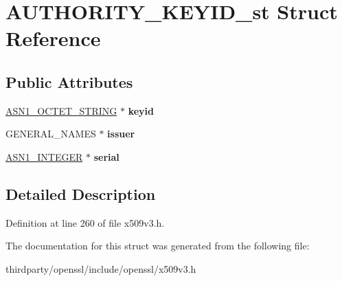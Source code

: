 \hypertarget{struct_a_u_t_h_o_r_i_t_y___k_e_y_i_d__st}{}\section{A\+U\+T\+H\+O\+R\+I\+T\+Y\+\_\+\+K\+E\+Y\+I\+D\+\_\+st Struct Reference}
\label{struct_a_u_t_h_o_r_i_t_y___k_e_y_i_d__st}
\subsection*{Public Attributes}
\begin{DoxyCompactItemize}
\item 
\mbox{\label{struct_a_u_t_h_o_r_i_t_y___k_e_y_i_d__st_ad9aea22a1fc62bcf0669f7feba4e38a7}} 
\hyperlink{structasn1__string__st}{A\+S\+N1\+\_\+\+O\+C\+T\+E\+T\+\_\+\+S\+T\+R\+I\+NG} $\ast$ {\bfseries keyid}
\item 
\mbox{\label{struct_a_u_t_h_o_r_i_t_y___k_e_y_i_d__st_a3a750d3a2a795e1a0dfb98f0e16bf339}} 
G\+E\+N\+E\+R\+A\+L\+\_\+\+N\+A\+M\+ES $\ast$ {\bfseries issuer}
\item 
\mbox{\label{struct_a_u_t_h_o_r_i_t_y___k_e_y_i_d__st_a266ae5a8b48cee3727995cf791bc7d8c}} 
\hyperlink{structasn1__string__st}{A\+S\+N1\+\_\+\+I\+N\+T\+E\+G\+ER} $\ast$ {\bfseries serial}
\end{DoxyCompactItemize}


\subsection{Detailed Description}


Definition at line 260 of file x509v3.\+h.



The documentation for this struct was generated from the following file\+:\begin{DoxyCompactItemize}
\item 
thirdparty/openssl/include/openssl/x509v3.\+h\end{DoxyCompactItemize}
